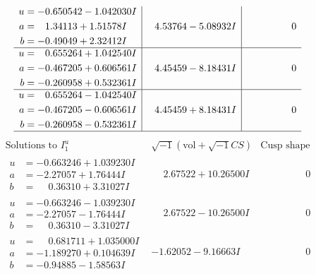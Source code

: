 \documentclass[1p]{elsarticle_modified}
\theoremstyle{definition}
\newcommand{\I}{\sqrt{-1}}
\begin{document}
$$\begin{array}{c|c|c}
\begin{aligned}
u &= -0.650542 - 1.042030 I \\
a &= \phantom{-}1.34113 + 1.51578 I \\
b &= -0.49049 + 2.32412 I\end{aligned}
 & \phantom{-}4.53764 - 5.08932 I & \phantom{-0.000000 } 0 \\ \hline\begin{aligned}
u &= \phantom{-}0.655264 + 1.042540 I \\
a &= -0.467205 + 0.606561 I \\
b &= -0.260958 + 0.532361 I\end{aligned}
 & \phantom{-}4.45459 - 8.18431 I & \phantom{-0.000000 } 0 \\ \hline\begin{aligned}
u &= \phantom{-}0.655264 - 1.042540 I \\
a &= -0.467205 - 0.606561 I \\
b &= -0.260958 - 0.532361 I\end{aligned}
 & \phantom{-}4.45459 + 8.18431 I & \phantom{-0.000000 } 0\\
 \hline 
 \end{array}$$\newpage$$\begin{array}{c|c|c}  
\text{Solutions to }I^u_{1}& \I (\text{vol} + \sqrt{-1}CS) & \text{Cusp shape}\\
 \hline 
\begin{aligned}
u &= -0.663246 + 1.039230 I \\
a &= -2.27057 + 1.76444 I \\
b &= \phantom{-}0.36310 + 3.31027 I\end{aligned}
 & \phantom{-}2.67522 + 10.26500 I & \phantom{-0.000000 } 0 \\ \hline\begin{aligned}
u &= -0.663246 - 1.039230 I \\
a &= -2.27057 - 1.76444 I \\
b &= \phantom{-}0.36310 - 3.31027 I\end{aligned}
 & \phantom{-}2.67522 - 10.26500 I & \phantom{-0.000000 } 0 \\ \hline\begin{aligned}
u &= \phantom{-}0.681711 + 1.035000 I \\
a &= -1.189270 + 0.104639 I \\
b &= -0.94885 - 1.58563 I\end{aligned}
 & -1.62052 - 9.16663 I & \phantom{-0.000000 } 0 \\ \hline\begin{aligned}

\end{aligned}
\end{array}$$
\end{document}

